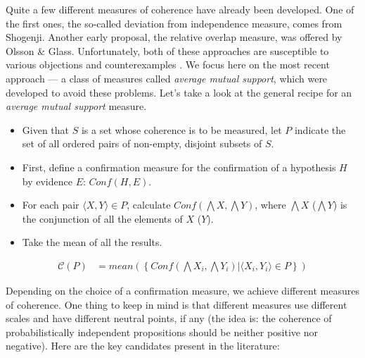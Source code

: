 \documentclass[10pt,]{scrartcl}
\begin{document}
Quite a few different measures of coherence have already been developed. One of the first ones, the so-called deviation from independence measure, comes from Shogenji. Another early proposal, the relative overlap measure, was offered by  Olsson \& Glass. 
Unfortunately, both of these approaches are susceptible to various objections and counterexamples . We focus here on the most recent approach --- a class of measures called
\textit{average mutual support}, which were developed to avoid these problems. Let’s take a look at  the general recipe for an \textit{average mutual support} measure.


\begin{itemize}
\item
  Given that \(S\) is a set whose coherence is to be measured, let \(P\)
  indicate the set of all ordered pairs of non-empty, disjoint subsets
  of \(S\).
\item
  First, define a confirmation measure for the confirmation of a hypothesis \(H\) by evidence  \(E\): \(Conf(H,E)\).
\item
  For each pair \(\langle X, Y \rangle \in P\), calculate
  \(Conf(\bigwedge X, \bigwedge Y)\), where $\bigwedge X$ ($\bigwedge Y$) is the conjunction of all the elements of $X$ ($Y$).
\item
  Take the mean of all the results.
\end{itemize}\begin{align*}
    \mathcal{C}(P) & =
mean\left(\left\{Conf(\bigwedge X_i, \bigwedge Y_i) | \langle X_i, Y_i \rangle \in P\right\} \right)
\end{align*}

\noindent Depending on the choice of a confirmation measure, we achieve
different measures of coherence.  One thing to keep in mind is
that different measures use different scales and have different neutral points, if any (the idea is: the coherence of probabilistically independent propositions should be neither positive nor
negative). Here are the key candidates present in the literature:
\end{document}
